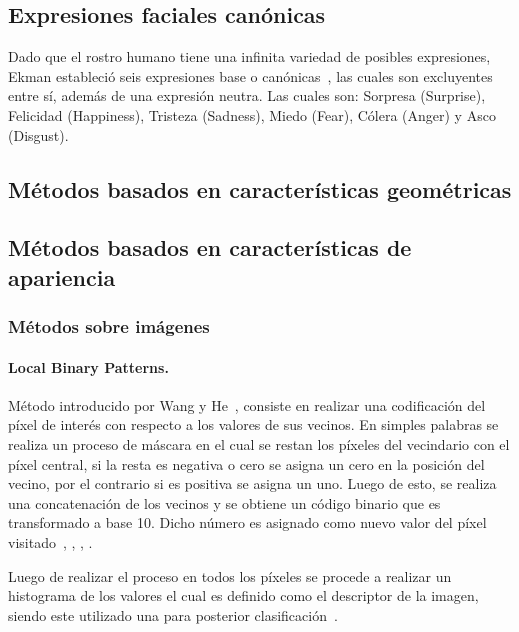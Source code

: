\subsection{Expresiones faciales canónicas}
\label{sec:type_fe}
Dado que el rostro humano tiene una infinita variedad de posibles expresiones, Ekman estableció seis expresiones base o canónicas~\cite{Ekman1981}, las cuales son excluyentes entre sí, además de una expresión neutra. Las cuales son: Sorpresa (Surprise), Felicidad (Happiness), Tristeza (Sadness), Miedo (Fear), Cólera (Anger) y Asco (Disgust).


\subsection{Métodos basados en características geométricas}
\label{sec:met_geo}

\subsection{Métodos basados en características de apariencia}
\label{sec:met_apa}

	\subsubsection{Métodos sobre imágenes}
	\label{sec:met_imagen}
	

		\paragraph{Local Binary Patterns.}
		\label{sec:lbp}
		Método introducido por Wang y He~\cite{Wang1990}, consiste en realizar una codificación del píxel de interés con respecto a los valores de sus vecinos. En simples palabras se realiza un proceso de máscara en el cual se restan los píxeles del vecindario con el píxel central, si la resta es negativa o cero se asigna un cero en la posición del vecino, por el contrario si es positiva se asigna un uno. Luego de esto, se realiza una concatenación de los vecinos y se obtiene un código binario que es transformado a base 10. Dicho número es asignado como nuevo valor del píxel visitado~\cite{Ojala1994}, \cite{Ojala2002}, \cite{Ahonen2004}, \cite{Shan2009}.

Luego de realizar el proceso en todos los píxeles se procede a realizar un histograma de los valores el cual es definido como el descriptor de la imagen, siendo este utilizado una para posterior clasificación~\cite{Ahonen2006}.

